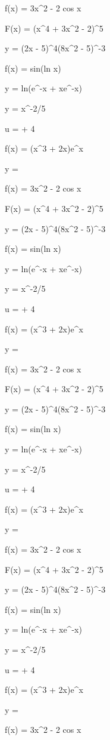 \documentclass[11pt,a4paper]{article}
\begin{document}
f(x) = 3x^2 - 2 cos x


 F(x) = (x^4 + 3x^2 - 2)^5

 y = (2x - 5)^4(8x^2 - 5)^{-3}

 f(x) = sin(ln x)

 y = ln(e^{-x} + xe^{-x})

y = x^{-2/5}

u =  + 4

f(x) = (x^3 + 2x)e^x

y = 

f(x) = 3x^2 - 2 cos x


 F(x) = (x^4 + 3x^2 - 2)^5

 y = (2x - 5)^4(8x^2 - 5)^{-3}

 f(x) = sin(ln x)

 y = ln(e^{-x} + xe^{-x})

y = x^{-2/5}

u =  + 4

f(x) = (x^3 + 2x)e^x

y = 

f(x) = 3x^2 - 2 cos x


 F(x) = (x^4 + 3x^2 - 2)^5

 y = (2x - 5)^4(8x^2 - 5)^{-3}

 f(x) = sin(ln x)

 y = ln(e^{-x} + xe^{-x})

y = x^{-2/5}

u =  + 4

f(x) = (x^3 + 2x)e^x

y = 

f(x) = 3x^2 - 2 cos x


 F(x) = (x^4 + 3x^2 - 2)^5

 y = (2x - 5)^4(8x^2 - 5)^{-3}

 f(x) = sin(ln x)

 y = ln(e^{-x} + xe^{-x})

y = x^{-2/5}

u =  + 4

f(x) = (x^3 + 2x)e^x

y = 

f(x) = 3x^2 - 2 cos x
\end{document}
